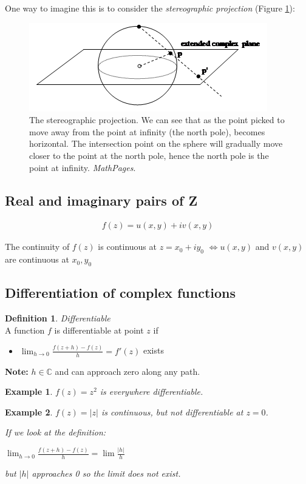 \documentclass{article}
\newtheorem{ex}{Example}
\theoremstyle{definition}
\newtheorem{definition}{Definition}[section]
\newcommand{\Def}[2]{
\begin{shaded*}
\begin{definition}{\textit{#1}}\\#2\end{definition}
\end{shaded*}
}
\def\C{\mathbb{C}}
\begin{document}
One way to imagine this is to consider the \textit{stereographic projection} (Figure \ref{fig:stereographic}):
\begin{figure}[H]
	\centering
	\includegraphics[width=0.5\linewidth]{stereographic_projection}
	\caption{The stereographic projection. We can see that as the point picked to move away from the point at infinity (the north pole), becomes horizontal. The intersection point on the sphere will gradually move closer to the point at the north pole, hence the north pole is the point at infinity. \textit{MathPages}.}
	\label{fig:stereographic}
\end{figure}


\subsection{Real and imaginary pairs of Z}

\begin{align}
	f(z) = u(x,y)+iv(x,y)
\end{align}

The continuity of $f(z)$ is continuous at $z = x_0 + iy_0$ $\iff u(x,y)$ and $v(x,y)$ are continuous at $x_0, y_0$ 

\subsection{Differentiation of complex functions}

\Def{Differentiable}{A function $f$ is differentiable at point $z$ if 
\begin{itemize}
	\item $\lim_{h\to0} \frac{f(z+h) - f(z)}{h} = f'(z)$ exists
\end{itemize}

\textbf{Note:} $h \in \C$ and can approach zero along any path. 
}


\begin{ex}
$f(z) = z^2$ is everywhere differentiable. 
\end{ex}

\begin{ex}
	$f(z) = |z|$ is continuous, but not differentiable at $z = 0$. 
	
	If we look at the definition:
	
	$\lim_{h\to0} \frac{f(z+h) - f(z)}{h} = \lim \frac{|h|}{h}$
	
	but $|h|$ approaches 0 so the limit does not exist.
\end{ex}
\end{document}
